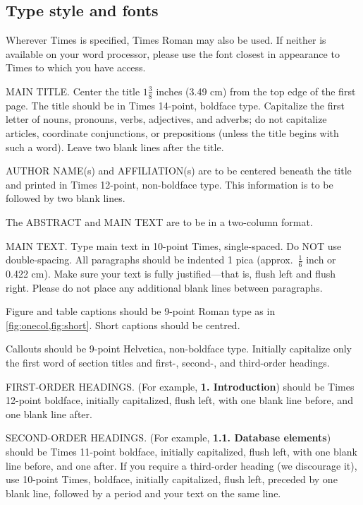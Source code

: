\documentclass[10pt,twocolumn,letterpaper]{article}
\begin{document}
\subsection{Type style and fonts}

Wherever Times is specified, Times Roman may also be used.
If neither is available on your word processor, please use the font closest in
appearance to Times to which you have access.

MAIN TITLE.
Center the title $1\frac{3}{8}$ inches (3.49 cm) from the top edge of the first page.
The title should be in Times 14-point, boldface type.
Capitalize the first letter of nouns, pronouns, verbs, adjectives, and adverbs;
do not capitalize articles, coordinate conjunctions, or prepositions (unless the title begins with such a word).
Leave two blank lines after the title.

AUTHOR NAME(s) and AFFILIATION(s) are to be centered beneath the title
and printed in Times 12-point, non-boldface type.
This information is to be followed by two blank lines.

The ABSTRACT and MAIN TEXT are to be in a two-column format.

MAIN TEXT.
Type main text in 10-point Times, single-spaced.
Do NOT use double-spacing.
All paragraphs should be indented 1 pica (approx.~$\frac{1}{6}$ inch or 0.422 cm).
Make sure your text is fully justified---that is, flush left and flush right.
Please do not place any additional blank lines between paragraphs.

Figure and table captions should be 9-point Roman type as in \cref{fig:onecol,fig:short}.
Short captions should be centred.

\noindent Callouts should be 9-point Helvetica, non-boldface type.
Initially capitalize only the first word of section titles and first-, second-, and third-order headings.

FIRST-ORDER HEADINGS.
(For example, {\large \bf 1. Introduction}) should be Times 12-point boldface, initially capitalized, flush left, with one blank line before, and one blank line after.

SECOND-ORDER HEADINGS.
(For example, { \bf 1.1. Database elements}) should be Times 11-point boldface, initially capitalized, flush left, with one blank line before, and one after.
If you require a third-order heading (we discourage it), use 10-point Times, boldface, initially capitalized, flush left, preceded by one blank line, followed by a period and your text on the same line.
\end{document}

